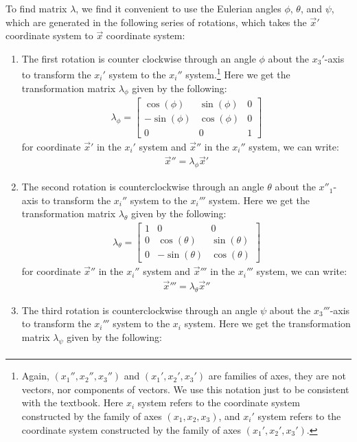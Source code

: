\documentclass[11pt,oneside]{book}
\theoremstyle{break}
\theoremstyle{break}
\newcommand{\bmat}[1]{\begin{bmatrix}
#1
\end{bmatrix}}
\begin{document}
To find matrix $\lambda$, we find it convenient to use the Eulerian angles $\phi$, $\theta$, and $\psi$, which are generated in the following series of rotations, which takes the $\vec{x}'$ coordinate system  to $\vec{x}$ coordinate system:
\begin{enumerate}
\item The first rotation is counter clockwise through an angle $\phi$ about the $x_3'$-axis to transform the $x_i'$ system to the $x_i''$ system.\footnote{Again, $(x_1'', x_2'', x_3'')$ and $(x_1', x_2', x_3')$ are families of axes, they are not vectors, nor components of vectors. We use this notation just to be consistent with the textbook. Here $x_i$ system refers to the coordinate system constructed by the family of axes $(x_1, x_2, x_3)$, and $x_i'$ system refers to the coordinate system constructed by the family of axes $(x_1', x_2', x_3')$.} Here we get the transformation matrix $\lambda_{\phi}$ given by the following:
\begin{align*}
\lambda_{\phi} = \bmat{\cos(\phi) & \sin(\phi) & 0 \\ -\sin(\phi) & \cos(\phi) & 0 \\ 0 & 0 &1} 
\end{align*}
for coordinate $\vec{x}'$ in the $x_i'$ system and $\vec{x}''$ in the $x_i''$ system, we can write:
\begin{align*}
\vec{x}'' = \lambda_{\phi} \vec{x}'
\end{align*}
\item The second rotation is counterclockwise through an angle $\theta$ about the $x''_1$-axis to transform the $x_i''$ system to the $x_i'''$ system. Here we get the transformation matrix $\lambda_{\theta}$ given by the following:
\begin{align*}
\lambda_{\theta} = \bmat{1 & 0 & 0 \\ 0 &\cos(\theta) & \sin(\theta) \\ 0 & -\sin(\theta) & \cos(\theta)} 
\end{align*}
for coordinate $\vec{x}''$ in the $x_i''$ system and $\vec{x}'''$ in the $x_i'''$ system, we can write:
\begin{align*}
\vec{x}''' = \lambda_{\theta} \vec{x}''
\end{align*}
\item The third rotation is counterclockwise through an angle $\psi$ about the $x_3'''$-axis to transform the $x_i'''$ system to the $x_i$ system. Here we get the transformation matrix $\lambda_{\psi}$ given by the following: 
\begin{align*}

\end{align*}
\end{enumerate}
\end{document}
